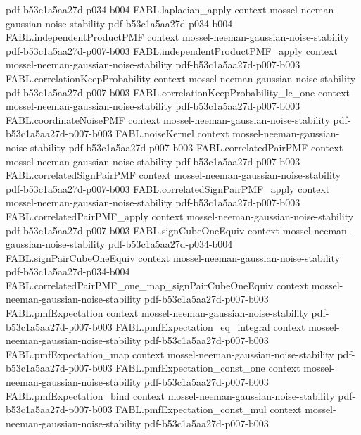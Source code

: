 \begin{theorem}
  {pdf-b53c1a5aa27d-p034-b004}
\proofstep
  {FABL.laplacian_apply}
  {context}
  {mossel-neeman-gaussian-noise-stability}
  {pdf-b53c1a5aa27d-p034-b004}
\proofstep
  {FABL.independentProductPMF}
  {context}
  {mossel-neeman-gaussian-noise-stability}
  {pdf-b53c1a5aa27d-p007-b003}
\proofstep
  {FABL.independentProductPMF_apply}
  {context}
  {mossel-neeman-gaussian-noise-stability}
  {pdf-b53c1a5aa27d-p007-b003}
\proofstep
  {FABL.correlationKeepProbability}
  {context}
  {mossel-neeman-gaussian-noise-stability}
  {pdf-b53c1a5aa27d-p007-b003}
\proofstep
  {FABL.correlationKeepProbability_le_one}
  {context}
  {mossel-neeman-gaussian-noise-stability}
  {pdf-b53c1a5aa27d-p007-b003}
\proofstep
  {FABL.coordinateNoisePMF}
  {context}
  {mossel-neeman-gaussian-noise-stability}
  {pdf-b53c1a5aa27d-p007-b003}
\proofstep
  {FABL.noiseKernel}
  {context}
  {mossel-neeman-gaussian-noise-stability}
  {pdf-b53c1a5aa27d-p007-b003}
\proofstep
  {FABL.correlatedPairPMF}
  {context}
  {mossel-neeman-gaussian-noise-stability}
  {pdf-b53c1a5aa27d-p007-b003}
\proofstep
  {FABL.correlatedSignPairPMF}
  {context}
  {mossel-neeman-gaussian-noise-stability}
  {pdf-b53c1a5aa27d-p007-b003}
\proofstep
  {FABL.correlatedSignPairPMF_apply}
  {context}
  {mossel-neeman-gaussian-noise-stability}
  {pdf-b53c1a5aa27d-p007-b003}
\proofstep
  {FABL.correlatedPairPMF_apply}
  {context}
  {mossel-neeman-gaussian-noise-stability}
  {pdf-b53c1a5aa27d-p007-b003}
\proofstep
  {FABL.signCubeOneEquiv}
  {context}
  {mossel-neeman-gaussian-noise-stability}
  {pdf-b53c1a5aa27d-p034-b004}
\proofstep
  {FABL.signPairCubeOneEquiv}
  {context}
  {mossel-neeman-gaussian-noise-stability}
  {pdf-b53c1a5aa27d-p034-b004}
\proofstep
  {FABL.correlatedPairPMF_one_map_signPairCubeOneEquiv}
  {context}
  {mossel-neeman-gaussian-noise-stability}
  {pdf-b53c1a5aa27d-p007-b003}
\proofstep
  {FABL.pmfExpectation}
  {context}
  {mossel-neeman-gaussian-noise-stability}
  {pdf-b53c1a5aa27d-p007-b003}
\proofstep
  {FABL.pmfExpectation_eq_integral}
  {context}
  {mossel-neeman-gaussian-noise-stability}
  {pdf-b53c1a5aa27d-p007-b003}
\proofstep
  {FABL.pmfExpectation_map}
  {context}
  {mossel-neeman-gaussian-noise-stability}
  {pdf-b53c1a5aa27d-p007-b003}
\proofstep
  {FABL.pmfExpectation_const_one}
  {context}
  {mossel-neeman-gaussian-noise-stability}
  {pdf-b53c1a5aa27d-p007-b003}
\proofstep
  {FABL.pmfExpectation_bind}
  {context}
  {mossel-neeman-gaussian-noise-stability}
  {pdf-b53c1a5aa27d-p007-b003}
\proofstep
  {FABL.pmfExpectation_const_mul}
  {context}
  {mossel-neeman-gaussian-noise-stability}
  {pdf-b53c1a5aa27d-p007-b003}

\end{theorem}
